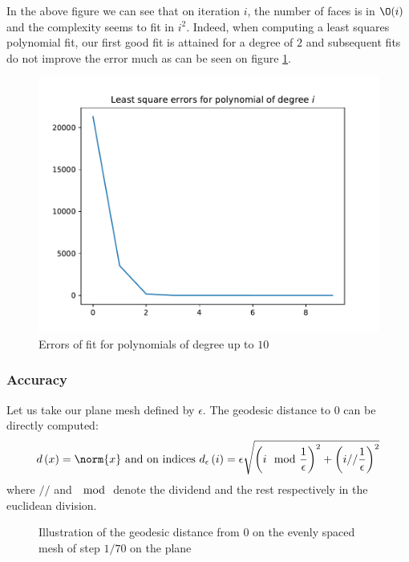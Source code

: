 \documentclass[math, info, english]{cours}
\begin{document}
In the above figure we can see that on iteration $i$, the number of faces is in $\O(i)$ and the complexity seems to fit in $i^{2}$.
Indeed, when computing a least squares polynomial fit, our first good fit is attained for a degree of $2$ and subsequent fits do not improve the error much as can be seen on figure \ref{polyfiterrors}.
\begin{figure}[h]
	\centering
	\includegraphics{Figures/polyfiterrors}
	\caption{Errors of fit for polynomials of degree up to $10$}
	\label{polyfiterrors}
\end{figure}

\subsubsection{Accuracy}
Let us take our plane mesh defined by $\epsilon$. The geodesic distance to $0$ can be directly computed:
\begin{equation*}
d\left( x \right) = \norm{x} \text{ and on indices } d_{\epsilon}\left( i \right) = \epsilon\sqrt{\left( i \mod \frac{1}{\epsilon} \right)^{2} + \left( i // \frac{1}{\epsilon} \right)^{2}}
\end{equation*}
where $//$ and $\mod$ denote the dividend and the rest respectively in the euclidean division.
\begin{figure}[H]
	\centering
	\caption{Illustration of the geodesic distance from $0$ on the evenly spaced mesh of step $1/70$ on the plane}
\end{figure}
\end{document}
